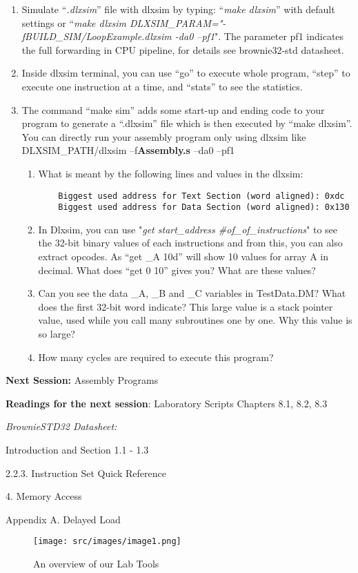 \begin{enumerate}
\begin{enumerate}
	\item Simulate ``\emph{.dlxsim}'' file with dlxsim by typing: ``\emph{make dlxsim}'' with default settings or ``\emph{make dlxsim DLXSIM\_PARAM="-fBUILD\_SIM/LoopExample.dlxsim -da0 --pf1}". The parameter pf1 indicates the full forwarding in CPU pipeline, for details see brownie32-std datasheet.
	\item Inside dlxsim terminal, you can use ``go'' to execute whole program, ``step'' to execute one instruction at a time, and ``stats'' to see the statistics.
	\item The command ``make sim'' adds some start-up and ending code to your program to generate a ``.dlxsim'' file which is then executed by ``make dlxsim''. You can directly run your assembly program only using dlxsim like DLXSIM\_PATH/dlxsim --f\textbf{Assembly.s} --da0 --pf1
	\begin{enumerate}[label=(\alph*)]
	\color{red}\item\normalcolor  What is meant by the following lines and values in the dlxsim:
	\begin{lstlisting}
	Biggest used address for Text Section (word aligned): 0xdc
	Biggest used address for Data Section (word aligned): 0x130
	\end{lstlisting}
	\color{red}\item\normalcolor  In Dlxsim, you can use "\emph{get start\_address \#of\_of\_instructions}" to see the 32-bit binary values of each instructions and from this, you can also extract opcodes. As ``get \_A 10d'' will show 10 values for array A in decimal. What does ``get 0
	10'' gives you? What are these values?
	\color{red}\item\normalcolor  Can you see the data \_A, \_B and \_C variables in TestData.DM? What does the first 32-bit word indicate? This large value is a stack pointer value, used while you call many subroutines one by one. Why this value is so large?
	\color{red}\item\normalcolor  How many cycles are required to execute this program?
	\end{enumerate}
\end{enumerate}
\end{enumerate}


	\textbf{Next Session:} Assembly Programs
	
	\textbf{Readings for the next session}: Laboratory Scripts Chapters 8.1, 8.2,
	8.3
	
	\textit{BrownieSTD32 Datasheet:}
	
	Introduction and Section 1.1 - 1.3
	
	2.2.3. Instruction Set Quick Reference
	
	4. Memory Access
	
	Appendix A. Delayed Load

\begin{figure}
	\centering
	\texttt{[image: src/images/image1.png]}
	\caption{An overview of our Lab Tools}
	\label{fig:fig1}
\end{figure}